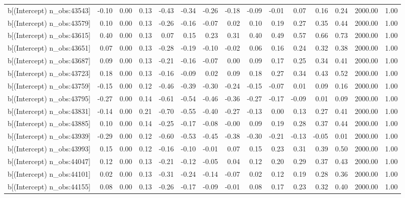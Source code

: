 \begin{table}[ht]
\begin{tabular}{rrrrrrrrrrrrrrr}
  b[(Intercept) n\_obs:43543] & -0.10 & 0.00 & 0.13 & -0.43 & -0.34 & -0.26 & -0.18 & -0.09 & -0.01 & 0.07 & 0.16 & 0.24 & 2000.00 & 1.00 \\ 
  b[(Intercept) n\_obs:43579] & 0.10 & 0.00 & 0.13 & -0.26 & -0.16 & -0.07 & 0.02 & 0.10 & 0.19 & 0.27 & 0.35 & 0.44 & 2000.00 & 1.00 \\ 
  b[(Intercept) n\_obs:43615] & 0.40 & 0.00 & 0.13 & 0.07 & 0.15 & 0.23 & 0.31 & 0.40 & 0.49 & 0.57 & 0.66 & 0.73 & 2000.00 & 1.00 \\ 
  b[(Intercept) n\_obs:43651] & 0.07 & 0.00 & 0.13 & -0.28 & -0.19 & -0.10 & -0.02 & 0.06 & 0.16 & 0.24 & 0.32 & 0.38 & 2000.00 & 1.00 \\ 
  b[(Intercept) n\_obs:43687] & 0.09 & 0.00 & 0.13 & -0.21 & -0.16 & -0.07 & 0.00 & 0.09 & 0.17 & 0.25 & 0.34 & 0.41 & 2000.00 & 1.00 \\ 
  b[(Intercept) n\_obs:43723] & 0.18 & 0.00 & 0.13 & -0.16 & -0.09 & 0.02 & 0.09 & 0.18 & 0.27 & 0.34 & 0.43 & 0.52 & 2000.00 & 1.00 \\ 
  b[(Intercept) n\_obs:43759] & -0.15 & 0.00 & 0.12 & -0.46 & -0.39 & -0.30 & -0.24 & -0.15 & -0.07 & 0.01 & 0.09 & 0.16 & 2000.00 & 1.00 \\ 
  b[(Intercept) n\_obs:43795] & -0.27 & 0.00 & 0.14 & -0.61 & -0.54 & -0.46 & -0.36 & -0.27 & -0.17 & -0.09 & 0.01 & 0.09 & 2000.00 & 1.00 \\ 
  b[(Intercept) n\_obs:43831] & -0.14 & 0.00 & 0.21 & -0.70 & -0.55 & -0.40 & -0.27 & -0.13 & 0.00 & 0.13 & 0.27 & 0.41 & 2000.00 & 1.00 \\ 
  b[(Intercept) n\_obs:43885] & 0.10 & 0.00 & 0.14 & -0.25 & -0.17 & -0.08 & -0.00 & 0.09 & 0.19 & 0.28 & 0.37 & 0.44 & 2000.00 & 1.00 \\ 
  b[(Intercept) n\_obs:43939] & -0.29 & 0.00 & 0.12 & -0.60 & -0.53 & -0.45 & -0.38 & -0.30 & -0.21 & -0.13 & -0.05 & 0.01 & 2000.00 & 1.00 \\ 
  b[(Intercept) n\_obs:43993] & 0.15 & 0.00 & 0.12 & -0.16 & -0.10 & -0.01 & 0.07 & 0.15 & 0.23 & 0.31 & 0.39 & 0.50 & 2000.00 & 1.00 \\ 
  b[(Intercept) n\_obs:44047] & 0.12 & 0.00 & 0.13 & -0.21 & -0.12 & -0.05 & 0.04 & 0.12 & 0.20 & 0.29 & 0.37 & 0.43 & 2000.00 & 1.00 \\ 
  b[(Intercept) n\_obs:44101] & 0.02 & 0.00 & 0.13 & -0.31 & -0.24 & -0.14 & -0.07 & 0.02 & 0.12 & 0.19 & 0.28 & 0.36 & 2000.00 & 1.00 \\ 
  b[(Intercept) n\_obs:44155] & 0.08 & 0.00 & 0.13 & -0.26 & -0.17 & -0.09 & -0.01 & 0.08 & 0.17 & 0.23 & 0.32 & 0.40 & 2000.00 & 1.00 \\ 

\end{tabular}
\end{table}
